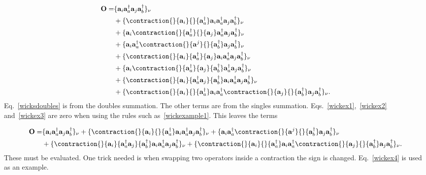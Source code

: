 \documentclass[graybox,sectrefs,envcountresetchap,open=right]{svmonodo}
\begin{document}
\begin{align}
\mathbf{O} = & 
\{
\mathbf{a}_i \mathbf{a}^{\dagger}_a \mathbf{a}_j \mathbf{a}^{\dagger}_b
\}_{\nu} \\ &
+ \{
\contraction{}{\mathbf{a}_i}{}{\mathbf{a}^{\dagger}_a}
\mathbf{a}_i \mathbf{a}^{\dagger}_a
\mathbf{a}_j \mathbf{a}^{\dagger}_b
\}_{\nu} \\ &
+ \{
\mathbf{a}_i
\contraction{}{\mathbf{a}^{\dagger}_a}{}{\mathbf{a}_j}
\mathbf{a}^{\dagger}_a \mathbf{a}_j
\mathbf{a}^{\dagger}_b
\}_{\nu} \label{wickex1} \\ &
+ \{
\mathbf{a}_i \mathbf{a}^{\dagger}_a
\contraction{}{\mathbf{a}^j}{}{\mathbf{a}^{\dagger}_b}
\mathbf{a}_j \mathbf{a}^{\dagger}_b
\}_{\nu} \\ &
+ \{
\contraction{}{\mathbf{a}_i}{\mathbf{a}^{\dagger}_a}{\mathbf{a}_j}
\mathbf{a}_i \mathbf{a}^{\dagger}_a \mathbf{a}_j
\mathbf{a}^{\dagger}_b
\}_{\nu} \label{wickex2} \\ &
+ \{
\mathbf{a}_i
\contraction{}{\mathbf{a}^{\dagger}_a}{\mathbf{a}_j}{\mathbf{a}^{\dagger}_b}
\mathbf{a}^{\dagger}_a \mathbf{a}_j \mathbf{a}^{\dagger}_b
\}_{\nu} \label{wickex3} \\ &
+ \{
\contraction{}{\mathbf{a}_i}{\mathbf{a}^{\dagger}_a \mathbf{a}_j}{\mathbf{a}^{\dagger}_b}
\mathbf{a}_i \mathbf{a}^{\dagger}_a \mathbf{a}_j \mathbf{a}^{\dagger}_b
\}_{\nu} \label{wickex4} \\ &
+ \{
\contraction{}{\mathbf{a}_i}{}{\mathbf{a}^{\dagger}_a}
\mathbf{a}_i \mathbf{a}^{\dagger}_a 
\contraction{}{\mathbf{a}_j}{}{\mathbf{a}^{\dagger}_b}
\mathbf{a}_j \mathbf{a}^{\dagger}_b
\}_{\nu} . \label{wicksdoubles}
\end{align} 
Eq.~\ref{wicksdoubles} is from the doubles summation. The other terms are from the singles summation. Eqs.~\ref{wickex1},~\ref{wickex2} and~\ref{wickex3} are zero when using the rules such as~\ref{wickexample1}. This leaves the terms

\begin{align}
\mathbf{O} = & 
\{
\mathbf{a}_i \mathbf{a}^{\dagger}_a \mathbf{a}_j \mathbf{a}^{\dagger}_b
\}_{\nu}
+ \{
\contraction{}{\mathbf{a}_i}{}{\mathbf{a}^{\dagger}_a}
\mathbf{a}_i \mathbf{a}^{\dagger}_a
\mathbf{a}_j \mathbf{a}^{\dagger}_b
\}_{\nu}
+ \{
\mathbf{a}_i \mathbf{a}^{\dagger}_a
\contraction{}{\mathbf{a}^j}{}{\mathbf{a}^{\dagger}_b}
\mathbf{a}_j \mathbf{a}^{\dagger}_b
\}_{\nu} \nonumber \\ &
+ \{
\contraction{}{\mathbf{a}_i}{\mathbf{a}^{\dagger}_a \mathbf{a}_j}{\mathbf{a}^{\dagger}_b}
\mathbf{a}_i \mathbf{a}^{\dagger}_a \mathbf{a}_j \mathbf{a}^{\dagger}_b
\}_{\nu}
+ \{
\contraction{}{\mathbf{a}_i}{}{\mathbf{a}^{\dagger}_a}
\mathbf{a}_i \mathbf{a}^{\dagger}_a 
\contraction{}{\mathbf{a}_j}{}{\mathbf{a}^{\dagger}_b}
\mathbf{a}_j \mathbf{a}^{\dagger}_b
\}_{\nu} .
\end{align} 
These must be evaluated. One trick needed is when swapping two operators inside a contraction the sign is changed. Eq.~\ref{wickex4} is used as an example.
\end{document}
